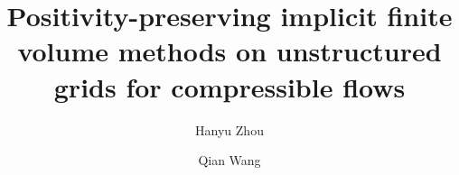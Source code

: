 \documentclass[preprint, 10pt]{elsarticle}
\begin{document}
	
\begin{frontmatter}
	
	

    \title{Positivity-preserving implicit finite volume methods on unstructured grids for compressible flows}
	
	
	\author[THU]{Hanyu Zhou}
	\author[CSRC]{Qian Wang}
	
	\address[THU]{Department of Engineering Mechanics, Tsinghua University, Beijing 100084, China}
	\address[CSRC]{Mechanics Division, Beijing Computational Science Research Center, Beijing 100193, China}
	

\end{frontmatter}
\end{document}

